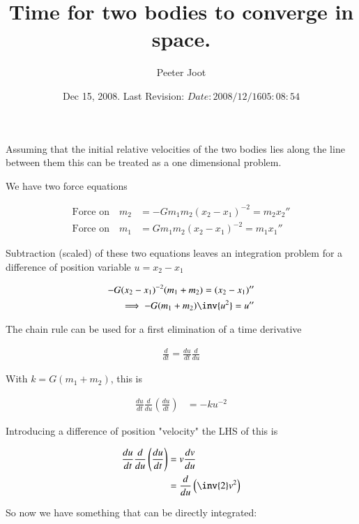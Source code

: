 \documentclass{article}
\title{ Time for two bodies to converge in space. }
\author{Peeter Joot}
\date{ Dec 15, 2008.  Last Revision: $Date: 2008/12/16 05:08:54 $ }
\begin{document}
\maketitle{}

%

Assuming that the initial relative velocities of the two bodies lies along
the line between them this can be treated as a one dimensional problem.

We have two force equations

\begin{align*}
\text{Force on} \quad m_2 &= - G m_1 m_2 (x_2 - x_1)^{-2} = m_2 {x_2}'' \\
\text{Force on} \quad m_1 &=  G m_1 m_2 (x_2 - x_1)^{-2} = m_1 {x_1}''
\end{align*}

Subtraction (scaled) of these two equations leaves an integration problem for a difference of position variable $u = x_2 - x_1$

\begin{align*}
- G (x_2 - x_1)^{-2} (m_1 + m_2)= (x_2 - x_1)'' \\
\implies
- G (m_1 + m_2) \inv{u^2} = u'' \\
\end{align*}

The chain rule can be used for a first elimination of a time derivative

\begin{align*}
\frac{d}{dt} = \frac{du}{dt} \frac{d}{du}
\end{align*}

With $k = G(m_1 + m_2)$, this is

\begin{align*}
\frac{du}{dt} \frac{d}{du} \left(\frac{du}{dt}\right) &= -k u^{-2}
\end{align*}

Introducing a difference of position "velocity" the LHS of this is

\begin{align*}
\frac{du}{dt} \frac{d}{du} \left(\frac{du}{dt}\right)
&= v \frac{dv}{du} \\
&= \frac{d}{du} \left( \inv{2}v^2 \right) \\
\end{align*}

So now we have something that can be directly integrated:
\end{document}

